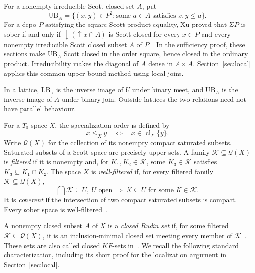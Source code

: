 \documentclass[fleqn,preprint,3p,a4paper]{elsarticle}
\theoremstyle{definition}
\begin{document}
For a nonempty irreducible Scott closed set $A$, put
\[
 \mathrm{UB}_A
   =\{(x,y)\in P^2:\text{some }a\in A\text{ satisfies }x,y\leq a\}.
\]
For a dcpo $P$ satisfying the square Scott product equality, Xu proved that $\Sigma P$ is sober if and only if ${\downarrow}({\uparrow}x\cap A)$ is Scott closed for every $x\in P$ and every nonempty irreducible Scott closed subset $A$ of $P$~\cite[Proposition~5.2]{Xu}. In the sufficiency proof, these sections make $\mathrm{UB}_A$ Scott closed in the order square, hence closed in the ordinary product. Irreducibility makes the diagonal of $A$ dense in $A\times A$. Section~\ref{sec:local} applies this common-upper-bound method using local joins.

In a lattice, $\mathrm{LB}_U$ is the inverse image of $U$ under binary meet, and $\mathrm{UB}_A$ is the inverse image of $A$ under binary join. Outside lattices the two relations need not have parallel behaviour.


For a $T_0$ space $X$, the specialization order is defined by
\[
 x\leq_X y\quad\Longleftrightarrow\quad x\in\operatorname{cl}_X\{y\}.
\]
Write $\mathcal Q(X)$ for the collection of its nonempty compact saturated subsets. Saturated subsets of a Scott space are precisely upper sets. A family $\mathcal K\subseteq\mathcal Q(X)$ is \emph{filtered} if it is nonempty and, for $K_1,K_2\in\mathcal K$, some $K_3\in\mathcal K$ satisfies $K_3\subseteq K_1\cap K_2$. The space $X$ is \emph{well-filtered} if, for every filtered family $\mathcal K\subseteq\mathcal Q(X)$,
\[
 \bigcap\mathcal K\subseteq U,~ U\text{ open}
 ~\Longrightarrow~
 K\subseteq U\text{ for some }K\in\mathcal K.
\]
It is \emph{coherent} if the intersection of two compact saturated subsets is compact. Every sober space is well-filtered~\cite[Theorem~II-1.21]{GHK}.

A nonempty closed subset $A$ of $X$ is a \emph{closed Rudin set} if, for some filtered $\mathcal K\subseteq\mathcal Q(X)$, it is an inclusion-minimal closed set meeting every member of $\mathcal K$~\cite{XZ}. These sets are also called closed $KF$-sets in~\cite{MLZ}. We recall the following standard characterization, including its short proof for the localization argument in Section~\ref{sec:local}.
\end{document}
